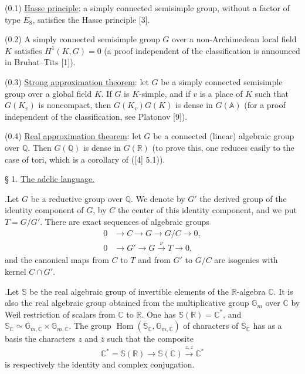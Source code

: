 \documentclass[10pt]{article}
\newcommand{\A}{\mathbb A}
\newcommand{\C}{\mathbb C}
\newcommand{\Gm}{\mathbb G_m}
\newcommand{\Q}{\mathbb Q}
\newcommand{\R}{\mathbb R}
\newcommand{\bS}{\mathbb S}
\newcommand{\Hom}{\operatorname{Hom}}
\begin{document}
\noindent (0.1) \uline{Hasse principle}: a simply connected semisimple group, without a factor of type $E_8$, satisfies the Hasse principle [3].

\noindent (0.2) A simply connected semisimple group $G$ over a non-Archimedean local field $K$ satisfies $H^1(K,G)=0$ (a proof independent of the classification is announced in Bruhat--Tits [1]).

\noindent (0.3) \uline{Strong approximation theorem}: let $G$ be a simply connected semisimple group over a global field $K$. If $G$ is $K$-simple, and if $v$ is a place of $K$ such that $G(K_v)$ is noncompact, then $G(K_v)G(K)$ is dense in $G(\A)$ (for a proof independent of the classification, see Platonov [9]).

\noindent (0.4) \uline{Real approximation theorem}: let $G$ be a connected (linear) algebraic group over $\Q$. Then $G(\Q)$ is dense in $G(\R)$ (to prove this, one reduces easily to the case of tori, which is a corollary of ([4] 5.1)).

\par\vspace{1.1em}
\noindent § 1. \uline{The adelic language.}\par\vspace{0.9em}

.\quad Let $G$ be a reductive group over $\Q$. We denote by $G'$ the derived group of the identity component of $G$, by $C$ the center of this identity component, and we put $T=G/G'$. There are exact sequences of algebraic groups
\begingroup
\makeatletter
\tagsleft@true
\makeatother
\begin{align}
0&\longrightarrow C\longrightarrow G\longrightarrow G/C\longrightarrow0,\tag{1.1.1}\\
0&\longrightarrow G'\longrightarrow G\xrightarrow{\nu}T\longrightarrow0,\tag{1.1.2}
\end{align}
\endgroup
and the canonical maps from $C$ to $T$ and from $G'$ to $G/C$ are isogenies with kernel $C\cap G'$.

.\quad Let $\bS$ be the real algebraic group of invertible elements of the $\R$-algebra $\C$. It is also the real algebraic group obtained from the multiplicative group $\Gm$ over $\C$ by Weil restriction of scalars from $\C$ to $\R$. One has $\bS(\R)=\C^*$, and $\bS_\C\simeq\mathbb G_{m,\C}\times\mathbb G_{m,\C}$. The group $\Hom(\bS_\C,\mathbb G_{m,\C})$ of characters of $\bS_\C$ has as a basis the characters $z$ and $\bar z$ such that the composite
\[
\C^*=\bS(\R)\longrightarrow \bS(\C)\xrightarrow{z,\bar z}\C^*
\]
is respectively the identity and complex conjugation.
\end{document}
